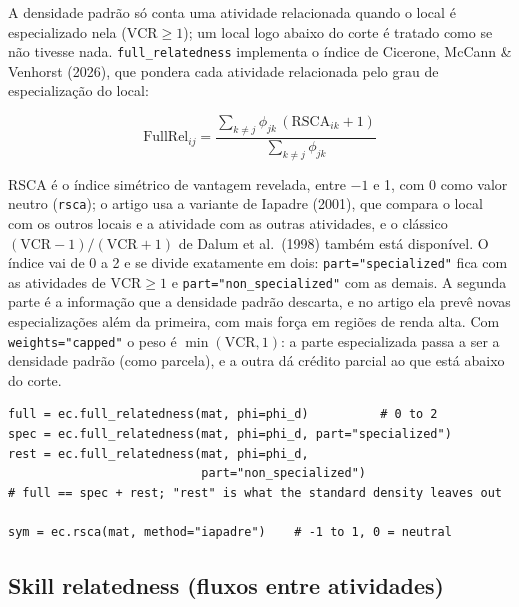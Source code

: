 \documentclass[12pt, a4paper]{article}
\newcommand{\fn}[1]{\texttt{#1}}
\begin{document}
\begin{sloppypar}
A densidade padr\~{a}o s\'{o} conta uma atividade relacionada quando o local
\'{e} especializado nela ($\text{VCR} \geq 1$); um local logo abaixo do
corte \'{e} tratado como se n\~{a}o tivesse nada. \fn{full\_relatedness}
implementa o \'{i}ndice de Cicerone, McCann \& Venhorst (2026), que pondera
cada atividade relacionada pelo grau de especializa\c{c}\~{a}o do local:
\end{sloppypar}

\[
  \text{FullRel}_{ij} = \frac{\sum_{k \neq j} \phi_{jk}\,(\text{RSCA}_{ik} + 1)}
                             {\sum_{k \neq j} \phi_{jk}}
\]

\begin{sloppypar}
RSCA \'{e} o \'{i}ndice sim\'{e}trico de vantagem revelada, entre $-1$ e 1,
com 0 como valor neutro (\fn{rsca}); o artigo usa a variante de Iapadre
(2001), que compara o local com os outros locais e a atividade com as
outras atividades, e o cl\'{a}ssico $(\text{VCR}-1)/(\text{VCR}+1)$ de Dalum
et al.\ (1998) tamb\'{e}m est\'{a} dispon\'{i}vel. O \'{i}ndice vai de 0 a 2
e se divide exatamente em dois: \texttt{part="specialized"} fica com as
atividades de $\text{VCR} \geq 1$ e \texttt{part="non\_specialized"} com
as demais. A segunda parte \'{e} a informa\c{c}\~{a}o que a densidade
padr\~{a}o descarta, e no artigo ela prev\^{e} novas especializa\c{c}\~{o}es
al\'{e}m da primeira, com mais for\c{c}a em regi\~{o}es de renda alta. Com
\texttt{weights="capped"} o peso \'{e} $\min(\text{VCR}, 1)$: a parte
especializada passa a ser a densidade padr\~{a}o (como parcela), e a outra
d\'{a} cr\'{e}dito parcial ao que est\'{a} abaixo do corte.
\end{sloppypar}

\begin{lstlisting}[caption={Full relatedness e suas duas partes}]
full = ec.full_relatedness(mat, phi=phi_d)          # 0 to 2
spec = ec.full_relatedness(mat, phi=phi_d, part="specialized")
rest = ec.full_relatedness(mat, phi=phi_d,
                           part="non_specialized")
# full == spec + rest; "rest" is what the standard density leaves out

sym = ec.rsca(mat, method="iapadre")    # -1 to 1, 0 = neutral
\end{lstlisting}

\subsection{Skill relatedness (fluxos entre atividades)}
\end{document}
